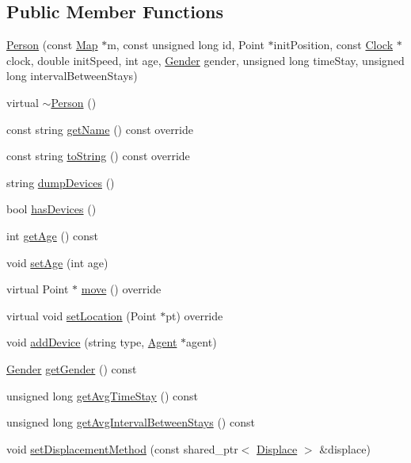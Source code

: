 \subsection*{Public Member Functions}
\begin{DoxyCompactItemize}
\item 
\mbox{\hyperlink{class_person_a1fb64d7ef7c528d01dd09b2099b00e38}{Person}} (const \mbox{\hyperlink{class_map}{Map}} $\ast$m, const unsigned long id, Point $\ast$init\+Position, const \mbox{\hyperlink{class_clock}{Clock}} $\ast$clock, double init\+Speed, int age, \mbox{\hyperlink{class_person_aff84ca16bd4dbf364614d86f20b29dd2}{Gender}} gender, unsigned long time\+Stay, unsigned long interval\+Between\+Stays)
\item 
virtual \mbox{\hyperlink{class_person_a6b5729bb56531c93312b1179c8ee4b71}{$\sim$\+Person}} ()
\item 
const string \mbox{\hyperlink{class_person_aa2a6f8d7f1d94045a03ca578f2ed272c}{get\+Name}} () const override
\item 
const string \mbox{\hyperlink{class_person_a68872538da519d0a04297f43376db27c}{to\+String}} () const override
\item 
string \mbox{\hyperlink{class_person_a0bc06f77b3e8a151f8c5cc77459895c9}{dump\+Devices}} ()
\item 
bool \mbox{\hyperlink{class_person_a40d6f2c716dd3c9794067817a3fb9165}{has\+Devices}} ()
\item 
int \mbox{\hyperlink{class_person_a4b66dbee570398920b8fb6aacddd2559}{get\+Age}} () const
\item 
void \mbox{\hyperlink{class_person_ac8ade54c27a0657c987c395ff04a9d46}{set\+Age}} (int age)
\item 
virtual Point $\ast$ \mbox{\hyperlink{class_person_a922e0462a1e7eac6523a9a864ce27afc}{move}} () override
\item 
virtual void \mbox{\hyperlink{class_person_a05f4ac2107d59e03f0f336eda08aa358}{set\+Location}} (Point $\ast$pt) override
\item 
void \mbox{\hyperlink{class_person_a3ce0a72a98c2e723e48dcd7b4d9af599}{add\+Device}} (string type, \mbox{\hyperlink{class_agent}{Agent}} $\ast$agent)
\item 
\mbox{\hyperlink{class_person_aff84ca16bd4dbf364614d86f20b29dd2}{Gender}} \mbox{\hyperlink{class_person_adb5a4fabaaa6bf851de701aeb9df4fdf}{get\+Gender}} () const
\item 
unsigned long \mbox{\hyperlink{class_person_a2b01d9997db6f6d4555dbc5ac9898077}{get\+Avg\+Time\+Stay}} () const
\item 
unsigned long \mbox{\hyperlink{class_person_a59d3ea8e10928537043ee7b3d24a470c}{get\+Avg\+Interval\+Between\+Stays}} () const
\item 
void \mbox{\hyperlink{class_person_a89ada26d3541bc82e514dae833dc959d}{set\+Displacement\+Method}} (const shared\+\_\+ptr$<$ \mbox{\hyperlink{class_displace}{Displace}} $>$ \&displace)
\end{DoxyCompactItemize}
